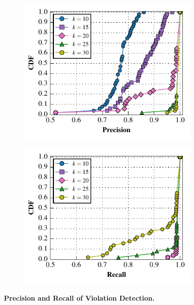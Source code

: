 \begin{figure}[t!]
  \centering
  \begin{subfigure}{0.48\textwidth}
  \includegraphics[width=\textwidth]{./figures/scripts/PrecisionFigure.pdf}
\end{subfigure}
  \begin{subfigure}{0.48\textwidth}
  \includegraphics[width=\textwidth]{./figures/scripts/RecallFigure.pdf}
\end{subfigure}
  \caption{\textbf{Precision and Recall of Violation Detection.}}
  \label{fig:precision}
\end{figure}

